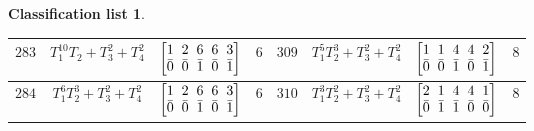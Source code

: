 \documentclass[10pt,a4paper]{amsart}
\theoremstyle{definition}
\newtheorem{class-list}[thm]{Classification list}
\numberwithin{equation}{section}
\begin{document}
\begin{class-list}
\begin{table}[h!]
\begin{tabu}{c|c|c|c||c|c|c|c}
\\
\hline
${283}$&${T_{1}^{10}T_{2}+T_{3}^{2}+T_{4}^{2}}$
&$\arraycolsep=1mm\begin{bmatrix}{1} & {2} & {6} & {6} & {3} \\ {\bar{0}} & {\bar{0}} & {\bar{1}} & {\bar{0}} & {\bar{1}}\end{bmatrix}$&${6}$
&${309}$&${T_{1}^{5}T_{2}^{3}+T_{3}^{2}+T_{4}^{2}}$
&$\arraycolsep=1mm\begin{bmatrix}{1} & {1} & {4} & {4} & {2} \\ {\bar{0}} & {\bar{0}} & {\bar{1}} & {\bar{0}} & {\bar{1}}\end{bmatrix}$&${8}$
\\
\hline
${284}$&${T_{1}^{6}T_{2}^{3}+T_{3}^{2}+T_{4}^{2}}$
&$\arraycolsep=1mm\begin{bmatrix}{1} & {2} & {6} & {6} & {3} \\ {\bar{0}} & {\bar{0}} & {\bar{1}} & {\bar{0}} & {\bar{1}}\end{bmatrix}$&${6}$
&${310}$&${T_{1}^{3}T_{2}^{2}+T_{3}^{2}+T_{4}^{2}}$
&$\arraycolsep=1mm\begin{bmatrix}{2} & {1} & {4} & {4} & {1} \\ {\bar{0}} & {\bar{1}} & {\bar{1}} & {\bar{0}} & {\bar{0}}\end{bmatrix}$&${8}$
\\
\hline
\end{tabu}\vspace{-4mm}
\end{table}


\end{class-list}
\end{document}
